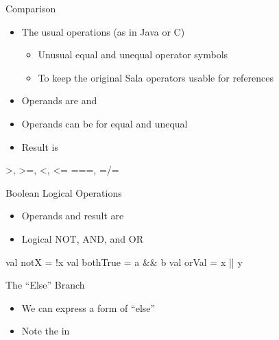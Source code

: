 \begin{frame}[fragile]{Comparison}
\begin{itemize}
\item The usual operations (as in Java or C)
\begin{itemize}
\item Unusual equal and unequal operator symbols
\item To keep the original Sala operators usable for references
\end{itemize}
\item Operands are  and 
\item Operands can be  for equal and unequal
\item Result is 
\end{itemize}
\begin{chisel}
>, >=, <, <=
===, =/=
\end{chisel}
\end{frame}

\begin{frame}[fragile]{Boolean Logical Operations}
\begin{itemize}
\item Operands and result are 
\item Logical NOT, AND, and OR
\end{itemize}
\begin{chisel}
val notX = !x
val bothTrue = a && b
val orVal = x || y
\end{chisel}
\end{frame}

\begin{frame}[fragile]{The ``Else'' Branch}
\begin{itemize}
\item We can express a form of ``else''
\item Note the  in 
\end{itemize}
\end{frame}



